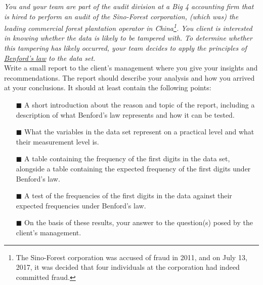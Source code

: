 \textit{You and your team are part of the audit division at a Big 4 accounting firm that is hired to perform an audit of the Sino-Forest corporation, (which was) the leading commercial forest plantation operator in China\footnote{The Sino-Forest corporation was accused of fraud in 2011, and on July 13, 2017, it was decided that four individuals at the corporation had indeed committed fraud.}. You client is interested in knowing whether the data is likely to be tampered with. To determine whether this tampering has likely occurred, your team decides to apply the principles of \href{https://en.wikipedia.org/wiki/Benford\%27s_law}{Benford's law} to the data set.} \\

Write a small report to the client's management where you give your insights and recommendations. The report should describe your analysis and how you arrived at your conclusions. It should at least contain the following points: \\

\begin{itemize}
    \item[$\blacksquare$] A short introduction about the reason and topic of the report, including a description of what Benford's law represents and how it can be tested.
    \item[$\blacksquare$] What the variables in the data set represent on a practical level and what their measurement level is. 
    \item[$\blacksquare$] A table containing the frequency of the first digits in the data set, alongside a table containing the expected frequency of the first digits under Benford's law.
    \item[$\blacksquare$] A test of the frequencies of the first digits in the data against their expected frequencies under Benford's law.
    \item[$\blacksquare$] On the basis of these results, your answer to the question(s) posed by the client's management.
\end{itemize}

\clearpage %